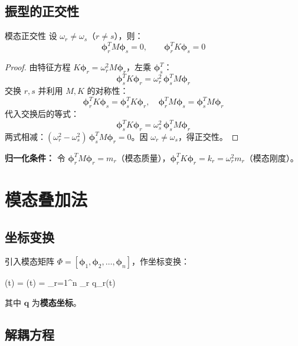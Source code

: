 \subsection{振型的正交性}

\begin{theorem}{模态正交性}
	设 $\omega_r \neq \omega_s$（$r \neq s$），则：
	\[
	\boldsymbol{\phi}_r^T M \boldsymbol{\phi}_s = 0, \qquad
	\boldsymbol{\phi}_r^T K \boldsymbol{\phi}_s = 0
	\]
\end{theorem}

\begin{proof}
	由特征方程 $K \boldsymbol{\phi}_r = \omega_r^2 M \boldsymbol{\phi}_r$，左乘 $\boldsymbol{\phi}_s^T$：
	\[
	\boldsymbol{\phi}_s^T K \boldsymbol{\phi}_r = \omega_r^2 \, \boldsymbol{\phi}_s^T M \boldsymbol{\phi}_r
	\]
	交换 $r, s$ 并利用 $M, K$ 的对称性：
	\[
	\boldsymbol{\phi}_r^T K \boldsymbol{\phi}_s = \boldsymbol{\phi}_s^T K \boldsymbol{\phi}_r, \quad
	\boldsymbol{\phi}_r^T M \boldsymbol{\phi}_s = \boldsymbol{\phi}_s^T M \boldsymbol{\phi}_r
	\]
	代入交换后的等式：
	\[
	\boldsymbol{\phi}_s^T K \boldsymbol{\phi}_r = \omega_s^2 \, \boldsymbol{\phi}_s^T M \boldsymbol{\phi}_r
	\]
	两式相减：$(\omega_r^2 - \omega_s^2) \, \boldsymbol{\phi}_s^T M \boldsymbol{\phi}_r = 0$。因 $\omega_r \neq \omega_s$，得正交性。
\end{proof}

\textbf{归一化条件：} 令 $\boldsymbol{\phi}_r^T M \boldsymbol{\phi}_r = m_r$（模态质量），$\boldsymbol{\phi}_r^T K \boldsymbol{\phi}_r = k_r = \omega_r^2 m_r$（模态刚度）。

\section{模态叠加法}

\subsection{坐标变换}

引入模态矩阵 $\Phi = [\boldsymbol{\phi}_1, \boldsymbol{\phi}_2, \ldots, \boldsymbol{\phi}_n]$，作坐标变换：
\begin{myformula}
	(t) = \Phi {}(t) = \sum_{r=1}^{n} \boldsymbol{\phi}_r q_r(t)
\end{myformula}
其中 $\mathbf{q}$ 为\textbf{模态坐标}。

\subsection{解耦方程}

